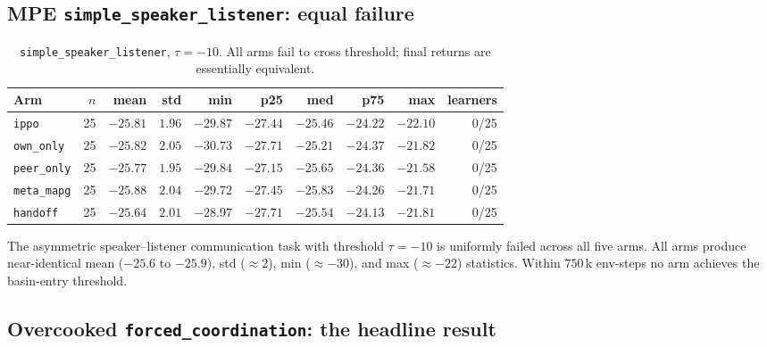 \documentclass[11pt,a4paper]{article}
\newcommand{\arm}[1]{\texttt{#1}}
\newcommand{\thr}{\tau}
\begin{document}
\subsection{MPE \texttt{simple\_speaker\_listener}: equal failure}

\begin{table}[h]
\centering
\caption{\texttt{simple\_speaker\_listener}, $\thr = -10$. All arms fail to cross threshold; final returns are essentially equivalent.}
\label{tab:speaker}
\small
\begin{tabular}{lrrrrrrrrr}
\toprule
\textbf{Arm} & $n$ & \textbf{mean} & \textbf{std} & \textbf{min} & \textbf{p25} & \textbf{med} & \textbf{p75} & \textbf{max} & \textbf{learners} \\
\midrule
\arm{ippo}      & 25 & $-25.81$ & $1.96$ & $-29.87$ & $-27.44$ & $-25.46$ & $-24.22$ & $-22.10$ & 0/25 \\
\arm{own\_only} & 25 & $-25.82$ & $2.05$ & $-30.73$ & $-27.71$ & $-25.21$ & $-24.37$ & $-21.82$ & 0/25 \\
\arm{peer\_only}& 25 & $-25.77$ & $1.95$ & $-29.84$ & $-27.15$ & $-25.65$ & $-24.36$ & $-21.58$ & 0/25 \\
\arm{meta\_mapg}& 25 & $-25.88$ & $2.04$ & $-29.72$ & $-27.45$ & $-25.83$ & $-24.26$ & $-21.71$ & 0/25 \\
\arm{handoff}   & 25 & $-25.64$ & $2.01$ & $-28.97$ & $-27.71$ & $-25.54$ & $-24.13$ & $-21.81$ & 0/25 \\
\bottomrule
\end{tabular}
\end{table}

The asymmetric speaker--listener communication task with threshold $\thr = -10$ is uniformly failed across all five arms.
All arms produce near-identical mean ($-25.6$ to $-25.9$), std ($\approx 2$), min ($\approx -30$), and max ($\approx -22$) statistics.
Within $750$\,k env-steps no arm achieves the basin-entry threshold.

\subsection{Overcooked \texttt{forced\_coordination}: the headline result}\label{ssec:forced}
\end{document}
